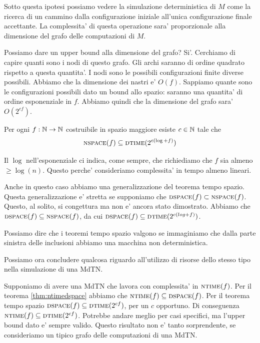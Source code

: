 Sotto questa ipotesi possiamo vedere la simulazione deterministica di $M$ come la ricerca di un
cammino dalla configurazione iniziale all'unica configurazione finale accettante. La complessita' di
questa operazione sara' proporzionale alla dimensione del grafo delle computazioni di $M$.

Possiamo dare un upper bound alla dimensione del grafo? Si'. Cerchiamo di capire quanti sono i nodi
di questo grafo. Gli archi saranno di ordine quadrato rispetto a questa quantita'. I nodi sono le
possibili configurazioni finite diverse possibili. Abbiamo che la dimensione dei nastri e' $O(f)$.
Sappiamo quante sono le configurazioni possibili dato un bound allo spazio: saranno una quantita' di
ordine esponenziale in $f$. Abbiamo quindi che la dimensione del grafo sara' $O(2^{cf})$.

\begin{thm}\label{thm:nspacedtime}
    Per ogni $f:\mathbb{N} \to \mathbb{N}$ costruibile in spazio maggiore esiste $c \in \mathbb{N}$ tale che
    \begin{equation*}
        \textsc{nspace}(f) \subseteq \textsc{dtime}(2^{c(\log + f)})
    \end{equation*}
\end{thm}

Il $\log$ nell'esponenziale ci indica, come sempre, che richiediamo che $f$ sia almeno $\geq
\log(n)$. Questo perche' consideriamo complessita' in tempo almeno lineari.

Anche in questo caso abbiamo una generalizzazione del teorema tempo spazio. Questa generalizzazione
e' stretta se supponiamo che $\textsc{dspace}(f) \subset \textsc{nspace}(f)$. Questo, al solito, si congettura ma
non e' ancora stato dimostrato. Abbiamo che $\textsc{dspace}(f) \subseteq \textsc{nspace}(f)$, da cui $\textsc{dspace}(f)
\subseteq \textsc{dtime}(2^{c(log + f)})$.

Possiamo dire che i teoremi tempo spazio valgono se immaginiamo che dalla parte sinistra delle
inclusioni abbiamo una macchina non deterministica.

Possiamo ora concludere qualcosa riguardo all'utilizzo di risorse dello stesso tipo nella
simulazione di una MdTN.

Supponiamo di avere una MdTN che lavora con complessita' in $\textsc{ntime}(f)$. Per il teorema
\ref{thm:ntimedspace} abbiamo che $\textsc{ntime}(f) \subseteq \textsc{dspace}(f)$. Per il teorema tempo spazio
$\textsc{dspace}(f) \subseteq \textsc{dtime}(2^{cf})$, per un $c$ opportuno. Di conseguenza $\textsc{ntime}(f) \subseteq
\textsc{dtime}(2^{cf})$. Potrebbe andare meglio per casi specifici, ma l'upper bound dato e' sempre valido.
Questo risultato non e' tanto sorprendente, se consideriamo un tipico grafo delle computazioni di
una MdTN.

